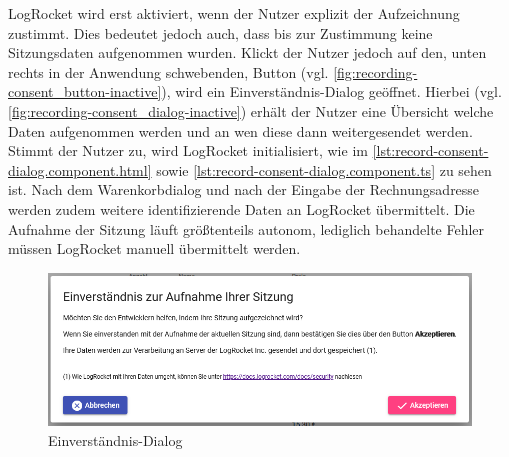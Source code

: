 LogRocket wird erst aktiviert, wenn der Nutzer explizit der Aufzeichnung zustimmt. Dies bedeutet jedoch auch, dass bis zur Zustimmung keine Sitzungsdaten aufgenommen wurden. Klickt der Nutzer jedoch auf den, unten rechts in der Anwendung schwebenden, Button (vgl. \autoref{fig:recording-consent_button-inactive}), wird ein Einverständnis-Dialog geöffnet. Hierbei (vgl. \autoref{fig:recording-consent_dialog-inactive}) erhält der Nutzer eine Übersicht welche Daten aufgenommen werden und an wen diese dann weitergesendet werden. Stimmt der Nutzer zu, wird LogRocket initialisiert, wie im \autoref{lst:record-consent-dialog.component.html} sowie \autoref{lst:record-consent-dialog.component.ts} zu sehen ist. Nach dem Warenkorbdialog und nach der Eingabe der Rechnungsadresse werden zudem weitere identifizierende Daten an LogRocket übermittelt. Die Aufnahme der Sitzung läuft größtenteils autonom, lediglich behandelte Fehler müssen LogRocket manuell übermittelt werden.
	
\begin{figure}[H]
	\centering
	\includegraphics[width=1.00\linewidth]{img/04_erstellung-poc/implementierung_frontend_recording-consent_dialog-inactive.png}
	\caption{Einverständnis-Dialog}
	\label{fig:recording-consent_dialog-inactive}
\end{figure}





